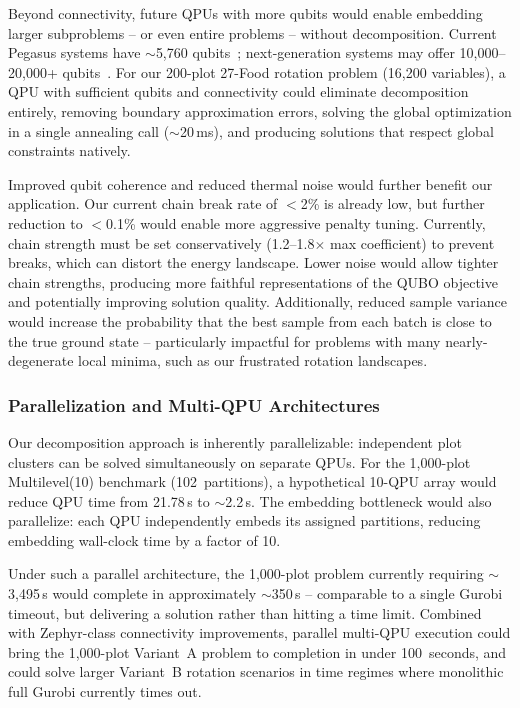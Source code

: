 \documentclass{oqireport}
\begin{document}
Beyond connectivity, future QPUs with more qubits would enable embedding larger subproblems -- or even entire problems -- without decomposition. Current Pegasus systems have $\sim$5,760 qubits~\cite{boothby2020next}; next-generation systems may offer 10,000--20,000+ qubits~\cite{boothby2021zephyr}. For our 200-plot 27-Food rotation problem (16,200 variables), a QPU with sufficient qubits and connectivity could eliminate decomposition entirely, removing boundary approximation errors, solving the global optimization in a single annealing call ($\sim$20\,ms), and producing solutions that respect global constraints natively.

Improved qubit coherence and reduced thermal noise would further benefit our application. Our current chain break rate of $<$2\% is already low, but further reduction to $<$0.1\% would enable more aggressive penalty tuning. Currently, chain strength must be set conservatively (1.2--1.8$\times$ max coefficient) to prevent breaks, which can distort the energy landscape. Lower noise would allow tighter chain strengths, producing more faithful representations of the QUBO objective and potentially improving solution quality. Additionally, reduced sample variance would increase the probability that the best sample from each batch is close to the true ground state -- particularly impactful for problems with many nearly-degenerate local minima, such as our frustrated rotation landscapes.

\subsubsection{Parallelization and Multi-QPU Architectures}

Our decomposition approach is inherently parallelizable: independent plot clusters can be solved simultaneously on separate QPUs. For the 1,000-plot Multilevel(10) benchmark (102~partitions), a hypothetical 10-QPU array would reduce QPU time from 21.78\,s to $\sim$2.2\,s. The embedding bottleneck would also parallelize: each QPU independently embeds its assigned partitions, reducing embedding wall-clock time by a factor of 10.

Under such a parallel architecture, the 1,000-plot problem currently requiring $\sim$3,495\,s would complete in approximately $\sim$350\,s -- comparable to a single Gurobi timeout, but delivering a solution rather than hitting a time limit. Combined with Zephyr-class connectivity improvements, parallel multi-QPU execution could bring the 1,000-plot Variant~A problem to completion in under 100~seconds, and could solve larger Variant~B rotation scenarios in time regimes where monolithic full Gurobi currently times out.
\end{document}
